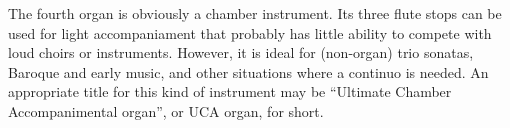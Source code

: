 \documentclass{article}
\begin{document}
{The fourth organ is obviously a chamber instrument. Its three flute stops can be used for light accompaniament that probably has little ability to compete with loud choirs or instruments. However, it is ideal for (non-organ) trio sonatas, Baroque and early music, and other situations where a continuo is needed. An appropriate title for this kind of instrument may be ``Ultimate Chamber Accompanimental organ'', or UCA organ, for short.

}
\end{document}
